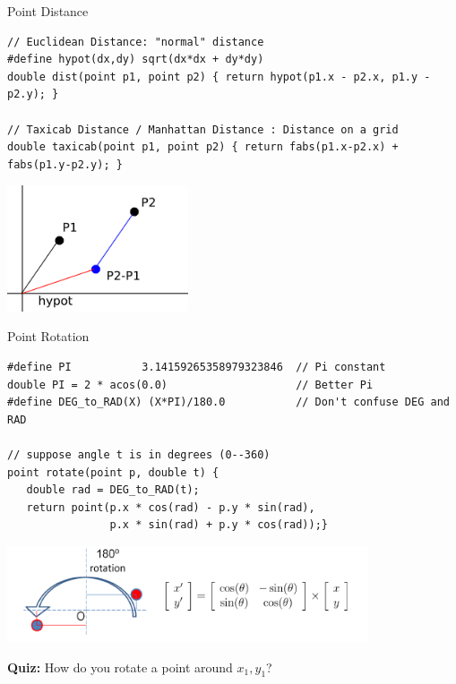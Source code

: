 \begin{frame}[fragile]{Point Distance}
    \begin{exampleblock}{}
{\smaller
\begin{verbatim}
// Euclidean Distance: "normal" distance
#define hypot(dx,dy) sqrt(dx*dx + dy*dy)
double dist(point p1, point p2) { return hypot(p1.x - p2.x, p1.y - p2.y); }

// Taxicab Distance / Manhattan Distance : Distance on a grid
double taxicab(point p1, point p2) { return fabs(p1.x-p2.x) + fabs(p1.y-p2.y); }
\end{verbatim}}
    \end{exampleblock}

    \begin{center}
      \includegraphics[width=0.4\textwidth]{../img/geom1}
    \end{center}
\end{frame}

\begin{frame}[fragile]{Point Rotation}

  {\smaller

    \begin{exampleblock}{}
\begin{verbatim}
#define PI           3.14159265358979323846  // Pi constant
double PI = 2 * acos(0.0)                    // Better Pi
#define DEG_to_RAD(X) (X*PI)/180.0           // Don't confuse DEG and RAD

// suppose angle t is in degrees (0--360)
point rotate(point p, double t) {
   double rad = DEG_to_RAD(t);
   return point(p.x * cos(rad) - p.y * sin(rad),
                p.x * sin(rad) + p.y * cos(rad));}
\end{verbatim}
    \end{exampleblock}
    \begin{center}
      \includegraphics[width=0.8\textwidth]{../img/rotation_halim}
    \end{center}
}
    {\bf Quiz:} How do you rotate a point around $x_1, y_1$?
\end{frame}

